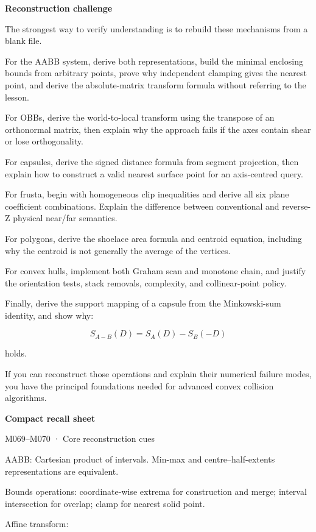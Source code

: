 \hypertarget{04-visual-computing-ii-ch022-reconstruction-and-mastery-gate}{}

\textbf{Reconstruction challenge}

The strongest way to verify understanding is to rebuild these mechanisms from a blank file.

For the AABB system, derive both representations, build the minimal enclosing bounds from arbitrary points, prove why independent clamping gives the nearest point, and derive the absolute-matrix transform formula without referring to the lesson.

For OBBs, derive the world-to-local transform using the transpose of an orthonormal matrix, then explain why the approach fails if the axes contain shear or lose orthogonality.

For capsules, derive the signed distance formula from segment projection, then explain how to construct a valid nearest surface point for an axis-centred query.

For frusta, begin with homogeneous clip inequalities and derive all six plane coefficient combinations. Explain the difference between conventional and reverse-Z physical near/far semantics.

For polygons, derive the shoelace area formula and centroid equation, including why the centroid is not generally the average of the vertices.

For convex hulls, implement both Graham scan and monotone chain, and justify the orientation tests, stack removals, complexity, and collinear-point policy.

Finally, derive the support mapping of a capsule from the Minkowski-sum identity, and show why:

\[
S_{A-B}(D)=S_A(D)-S_B(-D)
\]

holds.

If you can reconstruct those operations and explain their numerical failure modes, you have the principal foundations needed for advanced convex collision algorithms.

\textbf{Compact recall sheet}

M069--M070 · Core reconstruction cues

AABB: Cartesian product of intervals. Min-max and centre--half-extents representations are equivalent.

Bounds operations: coordinate-wise extrema for construction and merge; interval intersection for overlap; clamp for nearest solid point.

Affine transform:

